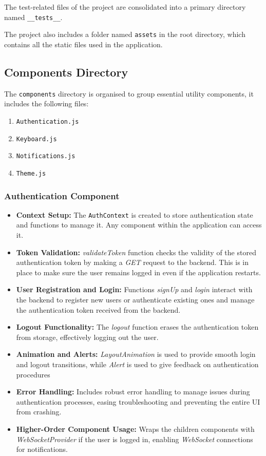 The test-related files of the project are consolidated into a primary directory named \texttt{\_\_tests\_\_}.

The project also includes a folder named \texttt{assets} in the root directory, which contains all the static files used in the application.

\subsection{Components Directory}

The \texttt{components} directory is organised to group essential utility components, it includes the following files:

\begin{enumerate}
    \item \texttt{Authentication.js}
    \item \texttt{Keyboard.js}
    \item \texttt{Notifications.js}
    \item \texttt{Theme.js}
\end{enumerate}

\subsubsection{Authentication Component}

\begin{itemize}
    \item \textbf{Context Setup:} The \texttt{AuthContext} is created to store authentication state and functions to manage it. Any component within the application can access it.
    \item \textbf{Token Validation:} \textit{validateToken} function checks the validity of the stored authentication token by making a \textit{GET} request to the backend. This is in place to make sure the user remains logged in even if the application restarts.
    \item \textbf{User Registration and Login:} Functions \textit{signUp} and \textit{login} interact with the backend to register new users or authenticate existing ones and manage the authentication token received from the backend.
    \item \textbf{Logout Functionality:} The \textit{logout} function erases the authentication token from storage, effectively logging out the user.
    \item \textbf{Animation and Alerts:} \textit{LayoutAnimation} is used to provide smooth login and logout transitions, while \textit{Alert} is used to give feedback on authentication procedures
    \item \textbf{Error Handling:} Includes robust error handling to manage issues during authentication processes, easing troubleshooting and preventing the entire UI from crashing.
    \item \textbf{Higher-Order Component Usage:} Wraps the children components with \textit{WebSocketProvider} if the user is logged in, enabling \textit{WebSocket} connections for notifications.
\end{itemize}

